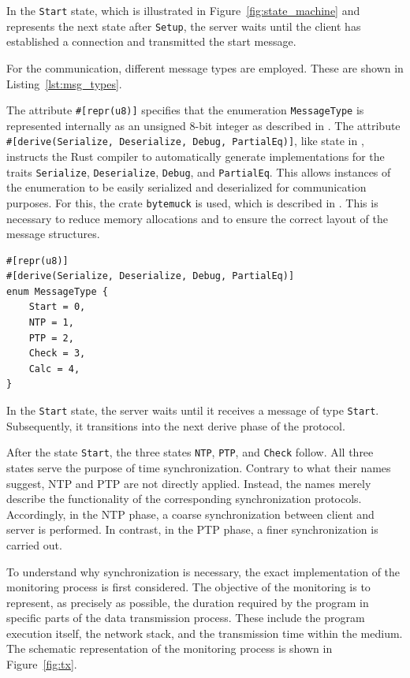 In the \texttt{Start} state, which is illustrated in Figure~\ref{fig:state_machine} and represents the next state after \texttt{Setup}, the server waits until the client has established a connection and transmitted the start message.  

For the communication, different message types are employed.  
These are shown in Listing~\ref{lst:msg_types}.  

The attribute \texttt{\#[repr(u8)]} specifies that the enumeration \texttt{MessageType} is represented internally as an unsigned 8-bit integer as described in \cite{repr}.  
The attribute \texttt{\#[derive(Serialize, Deserialize, Debug, PartialEq)]}, like state in \cite{derive}, instructs the Rust compiler to automatically generate implementations for the traits \texttt{Serialize}, \texttt{Deserialize}, \texttt{Debug}, and \texttt{PartialEq}.  
This allows instances of the enumeration to be easily serialized and deserialized for communication purposes.
For this, the crate \texttt{bytemuck} is used, which is described in \cite{bytemuck}.
This is necessary to reduce memory allocations and to ensure the correct layout of the message structures.

\begin{listing}[H]
    \centering
\begin{verbatim}
#[repr(u8)]
#[derive(Serialize, Deserialize, Debug, PartialEq)]
enum MessageType {
    Start = 0,
    NTP = 1,
    PTP = 2,
    Check = 3,
    Calc = 4,
}
\end{verbatim}
\caption{Message Types}
\label{lst:msg_types}
\end{listing}

In the \texttt{Start} state, the server waits until it receives a message of type \texttt{Start}.  
Subsequently, it transitions into the next derive phase of the protocol.  

After the state \texttt{Start}, the three states \texttt{\ac{NTP}}, \texttt{\ac{PTP}}, and \texttt{Check} follow.  
All three states serve the purpose of time synchronization.  
Contrary to what their names suggest, \ac{NTP} and \ac{PTP} are not directly applied.  
Instead, the names merely describe the functionality of the corresponding synchronization protocols.  
Accordingly, in the \ac{NTP} phase, a coarse synchronization between client and server is performed.  
In contrast, in the \ac{PTP} phase, a finer synchronization is carried out.  

To understand why synchronization is necessary, the exact implementation of the monitoring process is first considered.  
The objective of the monitoring is to represent, as precisely as possible, the duration required by the program in specific parts of the data transmission process.  
These include the program execution itself, the network stack, and the transmission time within the medium.  
The schematic representation of the monitoring process is shown in Figure~\ref{fig:tx}.  

